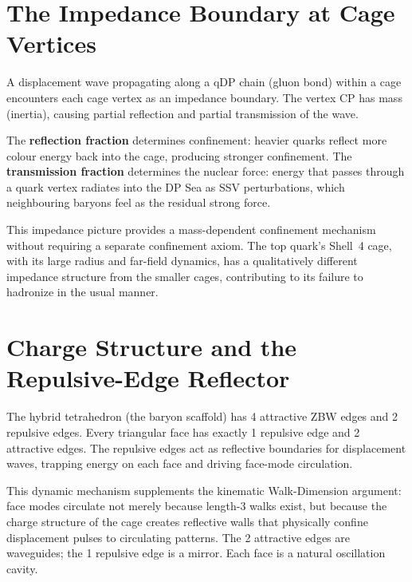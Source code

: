 \documentclass[11pt,letterpaper]{article}
\begin{document}
\section{The Impedance Boundary at Cage Vertices}
\label{app:impedance}

A displacement wave propagating along a qDP chain (gluon bond)
within a cage encounters each cage vertex as an impedance boundary.
The vertex CP has mass (inertia), causing partial reflection and
partial transmission of the wave.

The \textbf{reflection fraction} determines confinement: heavier
quarks reflect more colour energy back into the cage, producing
stronger confinement.  The \textbf{transmission fraction} determines
the nuclear force: energy that passes through a quark vertex
radiates into the DP Sea as SSV perturbations, which neighbouring
baryons feel as the residual strong force.

This impedance picture provides a mass-dependent confinement
mechanism without requiring a separate confinement axiom.  The
top quark's Shell~4 cage, with its large radius and far-field
dynamics, has a qualitatively different impedance structure from
the smaller cages, contributing to its failure to hadronize in the
usual manner.

\section{Charge Structure and the Repulsive-Edge Reflector}
\label{app:charge}

The hybrid tetrahedron (the baryon scaffold) has 4 attractive ZBW
edges and 2 repulsive edges.  Every triangular face has exactly
1 repulsive edge and 2 attractive edges.  The repulsive edges act
as reflective boundaries for displacement waves, trapping energy
on each face and driving face-mode circulation.

This dynamic mechanism supplements the kinematic Walk-Dimension
argument: face modes circulate not merely because length-3 walks
exist, but because the charge structure of the cage creates
reflective walls that physically confine displacement pulses to
circulating patterns.  The 2 attractive edges are waveguides; the
1 repulsive edge is a mirror.  Each face is a natural oscillation
cavity.



\end{document}
